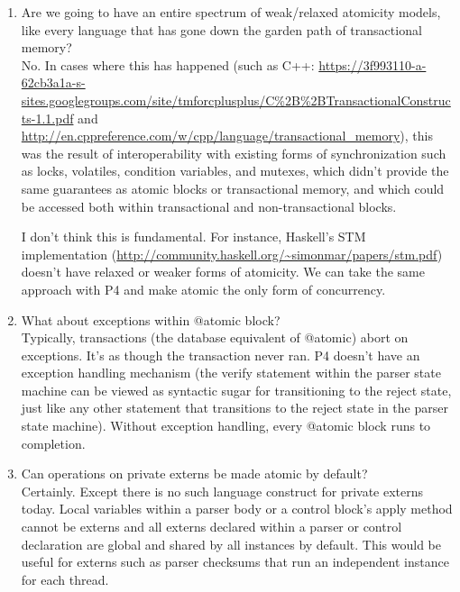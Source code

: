 \begin{enumerate}
\item Are we going to have an entire spectrum of weak/relaxed atomicity models,
like every language that has gone down the garden path of transactional memory?\\
No. In cases where this has happened (such as C++:
\url{https://3f993110-a-62cb3a1a-s-sites.googlegroups.com/site/tmforcplusplus/C\%2B\%2BTransactionalConstructs-1.1.pdf}
and \url{http://en.cppreference.com/w/cpp/language/transactional\_memory}), this was
the result of interoperability with existing forms of synchronization such as locks, volatiles,
condition variables, and mutexes, which didn't provide the same guarantees as atomic
blocks or transactional memory, and which could be accessed both within transactional
and non-transactional blocks.

I don't think this is fundamental. For instance, Haskell's STM implementation
(\url{http://community.haskell.org/~simonmar/papers/stm.pdf}) doesn't have
relaxed or weaker forms of atomicity. We can take the same approach with P4 and
make atomic the only form of concurrency.

\item What about exceptions within @atomic block? \\
Typically, transactions (the database equivalent of @atomic) abort on
exceptions.  It's as though the transaction never ran. P4 doesn't have an
exception handling mechanism (the verify statement within the parser state
machine can be viewed as syntactic sugar for transitioning to the reject state,
just like any other statement that transitions to the reject state in the
parser state machine). Without exception handling, every @atomic block runs to
completion.

\item Can operations on private externs be made atomic by default? \\
Certainly. Except there is no such language construct for private
externs today. Local variables within a parser body or a control block's apply
method cannot be externs and all externs declared within a parser or control
declaration are global and shared by all instances by default. This would be
useful for externs such as parser checksums that run an independent instance
for each thread.

\end{enumerate}
